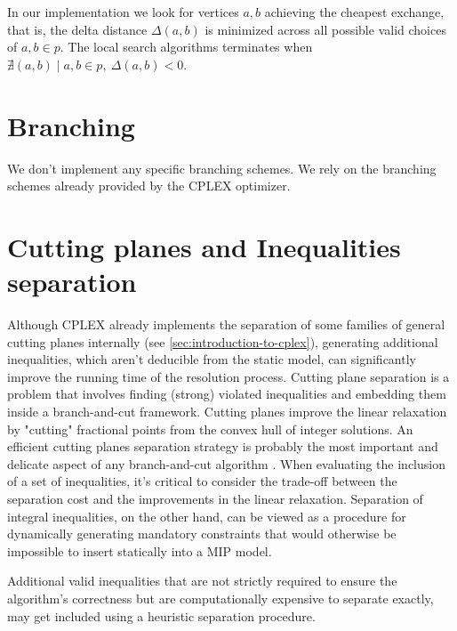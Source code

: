 In our implementation
we look for vertices $a, b$ achieving the cheapest exchange,
that is, the delta distance $\Delta(a, b)$ is minimized
across all possible valid choices of $a, b \in p$.
The local search algorithms terminates when $\nexists (a, b) \mid a, b \in p,\ \Delta(a, b) < 0$.

\section{Branching}
\label{sec:impl-branching}

We don't implement any specific branching schemes.
We rely on the branching schemes already provided by the CPLEX optimizer.

\section{Cutting planes and Inequalities separation}
\label{sec:impl-separation-techniques}

Although CPLEX already implements
the separation of some families of general cutting planes internally
(see \cref{sec:introduction-to-cplex}),
generating additional inequalities,
which aren't deducible from the static model,
can significantly improve the running time of the resolution process.
Cutting plane separation is a problem that involves finding (strong) violated inequalities
and embedding them inside a branch-and-cut framework.
Cutting planes improve the linear relaxation
by "cutting" fractional points from the convex hull of integer solutions.
An efficient cutting planes separation strategy
is probably the most important and delicate aspect of any branch-and-cut algorithm \parencite{ralphs2003}.
When evaluating the inclusion of a set of inequalities, it's critical to consider
the trade-off between the separation cost and the improvements in the linear relaxation.
Separation of integral inequalities, on the other hand,
can be viewed as a procedure for dynamically generating mandatory constraints
that would otherwise be impossible to insert statically into a MIP model.

Additional valid inequalities that are not strictly required to ensure the algorithm's correctness
but are computationally expensive to separate exactly,
may get included using a heuristic separation procedure.

